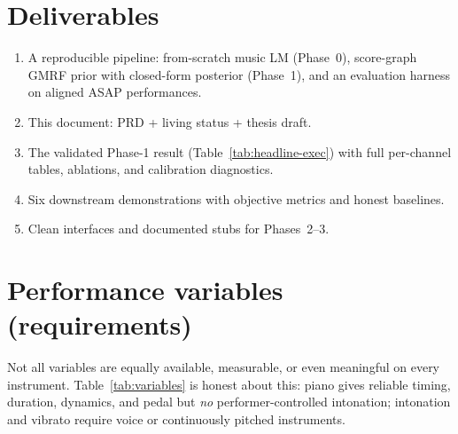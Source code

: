 \documentclass[11pt,a4paper]{report}
\begin{document}
\section{Deliverables}
\begin{enumerate}[leftmargin=*,noitemsep]
  \item A reproducible pipeline: from-scratch music LM (Phase~0), score-graph GMRF
        prior with closed-form posterior (Phase~1), and an evaluation harness on
        aligned ASAP performances.
  \item This document: PRD + living status + thesis draft.
  \item The validated Phase-1 result (Table~\ref{tab:headline-exec}) with full
        per-channel tables, ablations, and calibration diagnostics.
  \item Six downstream demonstrations with objective metrics and honest baselines.
  \item Clean interfaces and documented stubs for Phases~2--3.
\end{enumerate}

\section{Performance variables (requirements)}
Not all variables are equally available, measurable, or even meaningful on every
instrument. Table~\ref{tab:variables} is honest about this: piano gives reliable
timing, duration, dynamics, and pedal but \emph{no} performer-controlled
intonation; intonation and vibrato require voice or continuously pitched
instruments.
\end{document}
